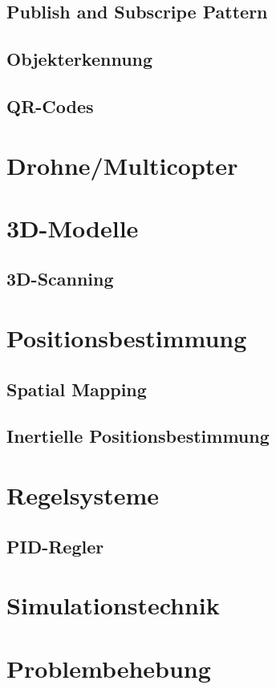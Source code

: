     \subsection{Publish and Subscripe Pattern}

    \subsection{Objekterkennung}

    \subsection{QR-Codes}

\section{Drohne/Multicopter}

\section{3D-Modelle}

    \subsection{3D-Scanning}

\section{Positionsbestimmung}

    \subsection{Spatial Mapping}

    \subsection{Inertielle Positionsbestimmung}

\section{Regelsysteme}

    \subsection{PID-Regler}

\section{Simulationstechnik}

\section{Problembehebung}
